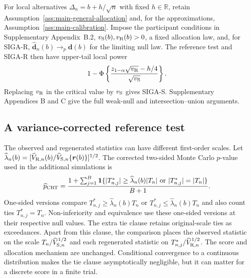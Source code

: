 \documentclass[12pt,a4paper]{article}
\theoremstyle{definition}
\begin{document}
For local alternatives $\Delta_n=b+h/\sqrt n$ with fixed $h\in\mathbb R$, retain Assumption~\ref{ass:main-general-allocation} and, for the approximations, Assumption~\ref{ass:main-calibration}. Impose the participant conditions in Supplementary Appendix~B.2, $v_{\rm S}(b),v_{\rm R}(b)>0$, a fixed allocation law, and, for SIGA-R, $\widehat{\bm d}_n(b)\to_p\bm d(b)$ for the limiting null law. The reference test and SIGA-R then have upper-tail local power
\begin{equation}\label{eq:local-power-main}
 1-\Phi\left\{\frac{z_{1-\alpha}\sqrt{v_{\rm R}}-h/4}
                        {\sqrt{v_{\rm S}}}\right\}.
\end{equation}
Replacing $v_{\rm R}$ in the critical value by $v_{\rm S}$ gives SIGA-S. Supplementary Appendices B and C give the full weak-null and intersection--union arguments.

\subsection{A variance-corrected reference test}\label{sec:corrected}
The observed and regenerated statistics can have different first-order scales. Let $\widehat\lambda_n(b)=[\widehat V_{{\rm R},n}(b)/\widehat V_{{\rm S},n}\{\bm r(b)\}]^{1/2}$. The corrected two-sided Monte Carlo $p$-value used in the additional simulations is
\begin{equation}\label{eq:crt-p}
 \widehat p_{\rm CRT}=\frac{1+\sum_{j=1}^B
 \mathbf 1\{|T^*_{n,j}|\ge\widehat\lambda_n(b)|T_n|
                  \ \text{or}\ |T^*_{n,j}|=|T_n|\}}{B+1}.
\end{equation}
One-sided versions compare $T^*_{n,j}\ge\widehat\lambda_n(b)T_n$ or $T^*_{n,j}\le\widehat\lambda_n(b)T_n$ and also count ties $T^*_{n,j}=T_n$. Non-inferiority and equivalence use these one-sided versions at their respective null values. The extra tie clause retains original-scale ties as exceedances. Apart from this clause, the comparison places the observed statistic on the scale $T_n/\widehat V_{{\rm S},n}^{1/2}$ and each regenerated statistic on $T^*_{n,j}/\widehat V_{{\rm R},n}^{1/2}$. The score and allocation mechanism are unchanged. Conditional convergence to a continuous distribution makes the tie clause asymptotically negligible, but it can matter for a discrete score in a finite trial.
\end{document}
